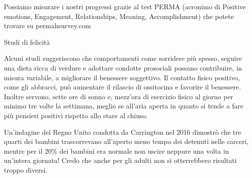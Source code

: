 \documentclass[12pt]{book} %
\begin{document}
Possiamo misurare i nostri progressi grazie al test PERMA (acronimo di Positive emotions, Engagement, Relationships,
Meaning, Accomplishment) che potete trovare su permahsurvey.com 

\begin{mdframed}[linewidth=1pt]
Studi di felicità 

Alcuni studi suggeriscono che comportamenti come sorridere più spesso, seguire una dieta ricca di verdure e adottare condotte prosociali possano contribuire, in misura variabile, a migliorare il benessere soggettivo. Il contatto fisico positivo, come gli abbracci, può aumentare il rilascio di ossitocina e favorire il benessere. Inoltre servono, sette ore di
sonno e, mezz'ora di esercizio fisico al giorno per minimo tre volte la settimana, meglio se
all'aria aperta in quanto si tende a fare più pensieri positivi rispetto allo stare al
chiuso.

Un'indagine del Regno Unito condotta da Carrington nel 2016 dimostrò che tre quarti dei bambini
trascorrevano all'aperto meno tempo dei detenuti nelle carceri, mentre per il 20\% dei bambini era
normale non uscire neppure una volta in un'intera giornata! Credo che anche per gli adulti non si
otterrebbero risultati troppo diversi.


\end{mdframed}
\end{document}

